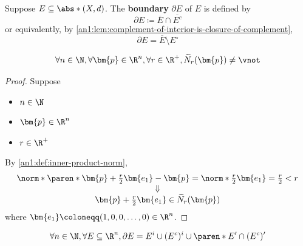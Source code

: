 \begin{definition} \label{an1:def:boundary}
  Suppose $E \subseteq \abs*{(X, d)}$. The \textbf{boundary} $\partial E$ of $E$ is defined by
  \[
    \partial E \coloneqq \overline{E} \cap \overline{E^{c}}
  \]
  or equivalently, by \cref{an1:lem:complement-of-interior-is-closure-of-complement},
  \[
    \partial E = \overline{E} \setminus E^{\circ}
  \]
\end{definition}

\begin{lemma} \label{an1:lem:deleted-neighborhood-in-Rn-is-non-empty}
  \[
    \forall n \in \N, \forall \bm{p} \in \R^{n}, \forall r \in \R^{+}, \widetilde{N}_{r}(\bm{p}) \neq \vnot
  \]
\end{lemma}

\begin{proof}
  Suppose
  \begin{itemize}
    \item $n \in \N$
    \item $\bm{p} \in \R^{n}$
    \item $r \in \R^{+}$
  \end{itemize}
  By \cref{an1:def:inner-product-norm},
  \[
    \begin{array}{c}
      \norm*{\paren*{\bm{p} + \frac{r}{2} \bm{e_{1}}} - \bm{p}} = \norm*{\frac{r}{2} \bm{e_{1}}} = \frac{r}{2} < r \\
      \Downarrow                                                                                                   \\
      \bm{p} + \frac{r}{2} \bm{e_{1}} \in \widetilde{N}_{r}(\bm{p})
    \end{array}
  \]
  where $\bm{e_{1}} \coloneqq (1, 0, 0, \dots, 0) \in \R^{n}$.
\end{proof}

\begin{theorem} \label{an1:thm:properties-of-boundary-in-rn}
  \[
    \forall n \in \N, \forall E \subseteq \R^{n}, \partial E = E^{i} \cup (E^{c})^{i} \cup \paren*{E' \cap (E^{c})'}
  \]
\end{theorem}

